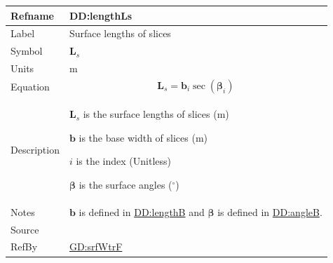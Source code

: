 \documentclass[12pt]{article}
\begin{document}
\medskip
\noindent
\begin{minipage}{\textwidth}
\begin{tabular}{>{\raggedright}p{}>{\raggedright\arraybackslash}p{}}
\toprule \textbf{Refname} & \textbf{DD:lengthLs}
\label{DD:lengthLs}
\\ \midrule
Label & Surface lengths of slices
        
\\ \midrule
Symbol & ${\symbf{L}_{s}}$
         
\\ \midrule
Units & ${\text{m}}$
        
\\ \midrule
Equation & \begin{displaymath}
           {\symbf{L}_{s}}={\symbf{b}}_{i} \sec\left({\symbf{β}}_{i}\right)
           \end{displaymath}
\\ \midrule
Description & \begin{symbDescription}
              \item{${\symbf{L}_{s}}$ is the surface lengths of slices (${\text{m}}$)}
              \item{$\symbf{b}$ is the base width of slices (${\text{m}}$)}
              \item{$i$ is the index (Unitless)}
              \item{$\symbf{β}$ is the surface angles (${{}^{\circ}}$)}
              \end{symbDescription}
\\ \midrule
Notes & $\symbf{b}$ is defined in \hyperref[DD:lengthB]{DD:lengthB} and $\symbf{β}$ is defined in \hyperref[DD:angleB]{DD:angleB}.
        
\\ \midrule
Source & \cite{fredlund1977}
         
\\ \midrule
RefBy & \hyperref[GD:srfWtrF]{GD:srfWtrF}
        
\\ \bottomrule
\end{tabular}
\end{minipage}
\end{document}
